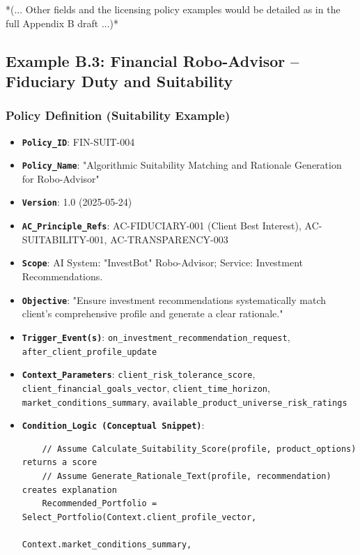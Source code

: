 \documentclass[sigconf,review,anonymous=false]{acmart} %
\begin{document}
*(... Other fields and the licensing policy examples would be detailed as in the full Appendix B draft ...)*

\subsection{Example B.3: Financial Robo-Advisor – Fiduciary Duty and Suitability}
\label{app:policy_example_finance}
\subsubsection{Policy Definition (Suitability Example)}
\begin{itemize}
    \item \textbf{\texttt{Policy\_ID}}: FIN-SUIT-004
    \item \textbf{\texttt{Policy\_Name}}: "Algorithmic Suitability Matching and Rationale Generation for Robo-Advisor"
    \item \textbf{\texttt{Version}}: 1.0 (2025-05-24)
    \item \textbf{\texttt{AC\_Principle\_Refs}}: AC-FIDUCIARY-001 (Client Best Interest), AC-SUITABILITY-001, AC-TRANSPARENCY-003
    \item \textbf{\texttt{Scope}}: AI System: "InvestBot" Robo-Advisor; Service: Investment Recommendations.
    \item \textbf{\texttt{Objective}}: "Ensure investment recommendations systematically match client's comprehensive profile and generate a clear rationale."
    \item \textbf{\texttt{Trigger\_Event(s)}}: \texttt{on\_investment\_recommendation\_request}, \texttt{after\_client\_profile\_update}
    \item \textbf{\texttt{Context\_Parameters}}: \texttt{client\_risk\_tolerance\_score}, \texttt{client\_financial\_goals\_vector}, \texttt{client\_time\_horizon}, \texttt{market\_conditions\_summary}, \texttt{available\_product\_universe\_risk\_ratings}
    \item \textbf{\texttt{Condition\_Logic (Conceptual Snippet)}}:
    \begin{verbatim}
    // Assume Calculate_Suitability_Score(profile, product_options) returns a score
    // Assume Generate_Rationale_Text(profile, recommendation) creates explanation
    Recommended_Portfolio = Select_Portfolio(Context.client_profile_vector,
                                           Context.market_conditions_summary,

\end{verbatim}
\end{itemize}
\end{document}
